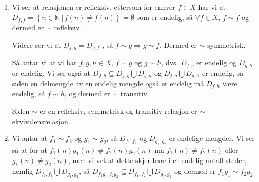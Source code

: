 \documentclass{article}[norsk]
\begin{document}
\begin{enumerate}[label=(\roman*)]
	\item Vi ser at relasjonen er refleksiv, ettersom for enhver $f\in X$ har vi at $D_{f,f}=\left\{n \in \mathbb{N}\,|\, f(n) \neq f(n)\right\}=\emptyset$ som er endelig, så $\forall f \in X,\, f\sim f$ og dermed er $\sim$ refleksiv.  
    
    Videre ser vi at $D_{f,g}=D_{g,f}$ , så $f\sim g\Rightarrow g\sim f$. Dermed er $\sim$ symmetrisk.
    
    Så antar vi at vi har $f,g,h\in X$, $f\sim g$ og $g\sim h$, dvs. $D_{f,g}$ er endelig og $D_{g,h}$ er endelig. Vi ser også at $D_{f,h} \subseteq D_{f,g}\bigcup D_{g,h}$ og $D_{f,g}\bigcup D_{g,h}$ er endelig, så siden en delmengde av en endelig mengde også er endelig må $D_{f,h}$ være endelig, så $f\sim h$, og  dermed er $\sim$ transitiv. 
    
    Siden $\sim$ er en refleksiv, symmetrisk og transitiv relasjon er $\sim$ ekvivalensrelasjon.
    
    \item Vi antar at $f_1 \sim f_2$ og $g_1 \sim g_2$, så $D_{f_1, f_2}$ og $D_{g_1, g_2} $ er endelige mengder. Vi ser så at for at $f_1(n)g_1(n) \neq f_2(n)g_2(n)$ må $f_1(n)\neq f_2(n)$ eller $g_1(n)\neq g_2(n)$, men vi vet at dette skjer bare i et endelig antall steder, nemlig $D_{f_1, f_2}\bigcup D_{g_1, g_2}$, så $D_{f_1g_1, f_2g_2}\subseteq D_{f_1, f_2}\bigcup D_{g_1, g_2}$ og dermed er $f_1g_1\sim f_2 g_2$ 
    

\end{enumerate}
\end{document}
